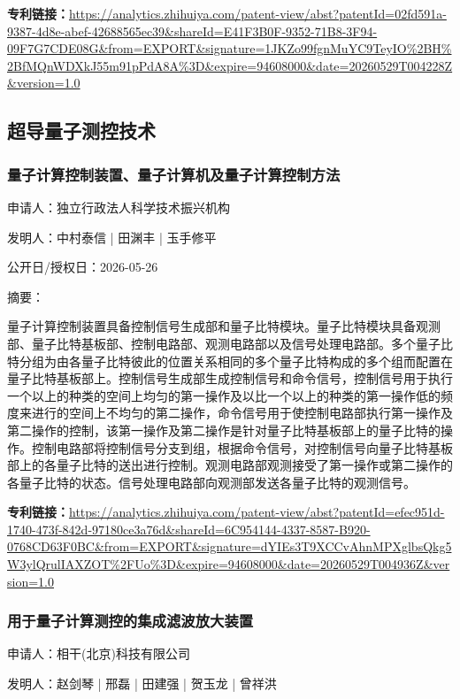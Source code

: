 \documentclass[12pt,a4paper]{ctexart}
\begin{document}
\noindent\textbf{专利链接：}\url{https://analytics.zhihuiya.com/patent-view/abst?patentId=02fd591a-9387-4d8e-abef-42688565ec39&shareId=E41F3B0F-9352-71B8-3F94-09F7G7CDE08G&from=EXPORT&signature=1JKZo99fgnMuYC9TeyIO%2BH%2BfMQnWDXkJ55m91pPdA8A%3D&expire=94608000&date=20260529T004228Z&version=1.0}


\subsection{ 超导量子测控技术 }

\subsubsection{ 量子计算控制装置、量子计算机及量子计算控制方法 }

申请人：独立行政法人科学技术振兴机构

发明人：中村泰信 | 田渊丰 | 玉手修平

公开日/授权日：2026-05-26

摘要：

量子计算控制装置具备控制信号生成部和量子比特模块。量子比特模块具备观测部、量子比特基板部、控制电路部、观测电路部以及信号处理电路部。多个量子比特分组为由各量子比特彼此的位置关系相同的多个量子比特构成的多个组而配置在量子比特基板部上。控制信号生成部生成控制信号和命令信号，控制信号用于执行一个以上的种类的空间上均匀的第一操作及以比一个以上的种类的第一操作低的频度来进行的空间上不均匀的第二操作，命令信号用于使控制电路部执行第一操作及第二操作的控制，该第一操作及第二操作是针对量子比特基板部上的量子比特的操作。控制电路部将控制信号分支到组，根据命令信号，对控制信号向量子比特基板部上的各量子比特的送出进行控制。观测电路部观测接受了第一操作或第二操作的各量子比特的状态。信号处理电路部向观测部发送各量子比特的观测信号。

\noindent\textbf{专利链接：}\url{https://analytics.zhihuiya.com/patent-view/abst?patentId=efec951d-1740-473f-842d-97180ce3a76d&shareId=6C954144-4337-8587-B920-0768CD63F0BC&from=EXPORT&signature=dYIEs3T9XCCvAhnMPXglbsQkg5W3ylQrulIAXZOT%2FUo%3D&expire=94608000&date=20260529T004936Z&version=1.0}

\subsubsection{ 用于量子计算测控的集成滤波放大装置 }

申请人：相干(北京)科技有限公司

发明人：赵剑琴 | 邢磊 | 田建强 | 贺玉龙 | 曾祥洪
\end{document}

